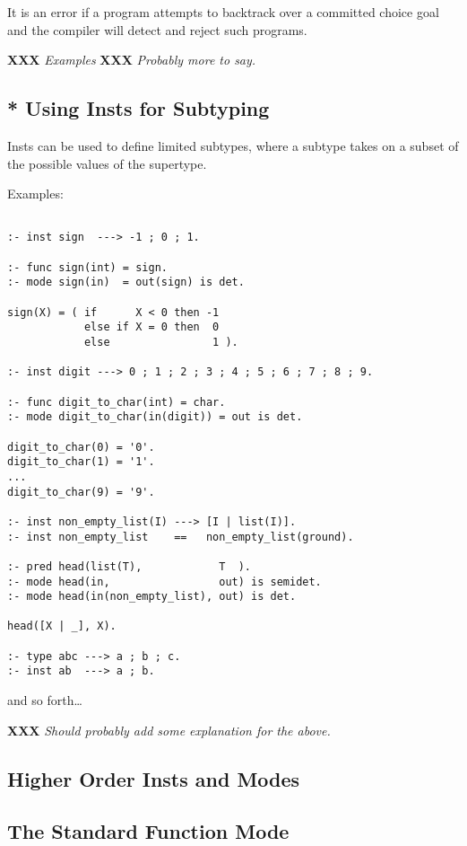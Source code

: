 \documentclass[a4paper,11pt,notitlepage,onecolumn]{article}
\newcommand{\XXX}[1]%
{{\small\textbf{XXX} \emph{#1}}}
\begin{document}
It is an error if a program attempts to backtrack over a
committed choice goal and the compiler will detect and reject
such programs.

\XXX{Examples}
\XXX{Probably more to say.}

\subsection{* Using Insts for Subtyping}

Insts can be used to define limited subtypes, where a subtype
takes on a subset of the possible values of the supertype.

Examples:
\begin{verbatim}

:- inst sign  ---> -1 ; 0 ; 1.

:- func sign(int) = sign.
:- mode sign(in)  = out(sign) is det.

sign(X) = ( if      X < 0 then -1
            else if X = 0 then  0
            else                1 ).

:- inst digit ---> 0 ; 1 ; 2 ; 3 ; 4 ; 5 ; 6 ; 7 ; 8 ; 9.

:- func digit_to_char(int) = char.
:- mode digit_to_char(in(digit)) = out is det.

digit_to_char(0) = '0'.
digit_to_char(1) = '1'.
...
digit_to_char(9) = '9'.

:- inst non_empty_list(I) ---> [I | list(I)].
:- inst non_empty_list    ==   non_empty_list(ground).

:- pred head(list(T),            T  ).
:- mode head(in,                 out) is semidet.
:- mode head(in(non_empty_list), out) is det.

head([X | _], X).

:- type abc ---> a ; b ; c.
:- inst ab  ---> a ; b.
\end{verbatim}
and so forth\ldots

\XXX{Should probably add some explanation for the above.}

\subsection{Higher Order Insts and Modes}



\subsection{The Standard Function Mode}
\end{document}
